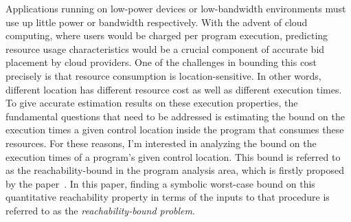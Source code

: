 {Applications running on low-power devices or low-bandwidth environments must use up little power or bandwidth respectively. 
With the advent of cloud computing, where users would be charged per program execution,
predicting resource usage characteristics would be a crucial component of accurate bid placement by cloud providers. 
One of the challenges in bounding this cost precisely is that resource consumption is location-sensitive.
In other words, different location has different resource cost as well as different execution times.
To give accurate estimation results on these execution properties,
the fundamental questions that need to be addressed 
is estimating the bound on the execution times
a given control location inside the program that consumes these resources.
For these reasons, I'm interested in analyzing the bound on the execution times of a program's given control location.
This bound is referred to as the reachability-bound in the program analysis area,
which is firstly proposed by the paper~\cite{GulwaniZ10}.
In this paper, finding a symbolic worst-case bound on this quantitative reachability property
in terms of the inputs to that procedure
is referred to as the \emph{reachability-bound problem}.
}


